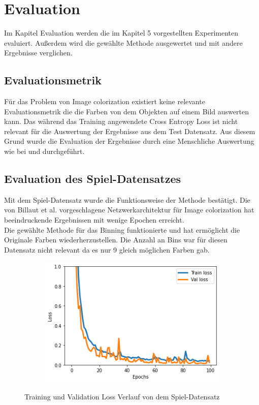 \chapter{Evaluation}
\label{sec:evaluation}
Im Kapitel Evaluation werden die im Kapitel 5 vorgestellten Experimenten evaluiert. Außerdem wird die gewählte Methode ausgewertet und
mit andere Ergebnisse verglichen.

\section{Evaluationsmetrik}
Für das Problem von Image colorization existiert keine relevante Evaluationsmetrik die die Farben von dem Objekten auf einem Bild auswerten kann.
Das während das Training angewendete Cross Entropy Loss ist nicht relevant für die Auswertung der Ergebnisse aus dem Test Datensatz. Aus diesem
Grund wurde die Evaluation der Ergebnisse durch eine Menschliche Auswertung wie bei \cite{zhang2016colorful} und \cite{billaut2018colorunet}
durchgeführt.

\section{Evaluation des Spiel-Datensatzes}
Mit dem Spiel-Datensatz wurde die Funktionsweise der Methode bestätigt. Die von Billaut et al. vorgeschlagene Netzwerkarchitektur für Image
colorization hat beeindruckende Ergebnissen mit wenige Epochen erreicht. 
\\
Die gewählte Methode für das Binning funktionierte und hat ermöglicht die Originale Farben wiederherzustellen. Die Anzahl an 
Bins war für diesen Datensatz nicht relevant da es nur 9 gleich möglichen Farben gab.

\begin{figure}[H]
  \vspace{1cm}
  \centering
  \begin{subfigure}
    \centering
    \includegraphics[width=.5\textwidth]{resources/experiments/toy_100_324_0001.png}
  \end{subfigure}
  \caption{Training und Validation Loss Verlauf von dem Spiel-Datensatz}
  \label{image:toy-dataset-loss}
\end{figure}


